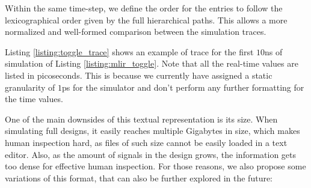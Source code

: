 Within the same time-step, we define the order for the entries to follow the lexicographical order given by the full hierarchical paths. This allows a more normalized and well-formed comparison between the simulation traces.

Listing \ref{listing:toggle_trace} shows an example of trace for the first $10$ns of simulation of Listing \ref{listing:mlir_toggle}. Note that all the real-time values are listed in picoseconds. This is because we currently have assigned a static granularity of $1$ps for the simulator and don't perform any further formatting for the time values.


One of the main downsides of this textual representation is its size. When simulating full designs, it easily reaches multiple Gigabytes in size, which makes human inspection hard, as files of such size cannot be easily loaded in a text editor. Also, as the amount of signals in the design grows, the information gets too dense for effective human inspection.
For those reasons, we also propose some variations of this format, that can also be further explored in the future:

